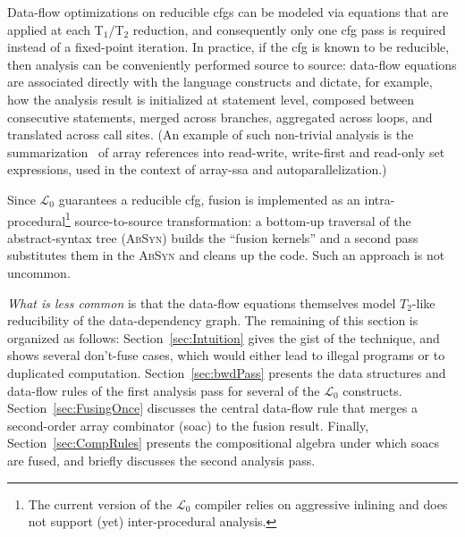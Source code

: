 \documentclass{sigplanconf}  %
\newcommand{\LO}{$\mathcal{L}_0$}
\begin{document}
Data-flow optimizations on reducible {\sc cfg}s can be modeled via equations 
that are applied at each T$_1$/T$_2$ reduction, and consequently only one
{\sc cfg} pass is required instead of a fixed-point iteration.
%
In practice, if the {\sc cfg} is known to be reducible, then 
analysis can be conveniently performed source to source: 
data-flow equations are associated directly with the
language constructs and dictate, for example, how the analysis result is
initialized at statement level, composed between consecutive statements,
merged across branches, aggregated across loops, and translated across 
call sites.  (An example of such non-trivial 
analysis is the summarization~\cite{HybAn} of array references into 
read-write, write-first and read-only set expressions, used in the context 
of array-{\sc ssa} and autoparallelization.)
 
Since \LO{} guarantees a reducible {\sc cfg}, %
fusion is implemented as an intra-procedural\footnote{
The current version of the \LO{} compiler 
relies on aggressive inlining and does not support
(yet) inter-procedural analysis.
}
source-to-source transformation: a bottom-up traversal of the 
abstract-syntax tree (\textsc{AbSyn}) builds the ``fusion kernels'' 
and a second pass substitutes them in the \textsc{AbSyn} and 
cleans up the code.    Such an approach is not uncommon. 

{\em What is less common} is that the data-flow equations 
themselves model $T_2$-like reducibility of the data-dependency graph.
The remaining of this section is organized as follows:
Section~\ref{sec:Intuition} gives the gist of the technique,
and shows several don't-fuse cases, which would
either lead to illegal programs or to duplicated computation.
%
Section~\ref{sec:bwdPass} presents the data structures and
data-flow rules of the first analysis pass for several of the
\LO{} constructs.
%
Section~\ref{sec:FusingOnce} discusses the central data-flow rule
that merges a second-order array combinator ({\sc soac}) to the 
fusion result.
%
Finally, Section~\ref{sec:CompRules} presents the compositional 
algebra under which {\sc soac}s are fused, and briefly discusses
the second analysis pass.
\end{document}
